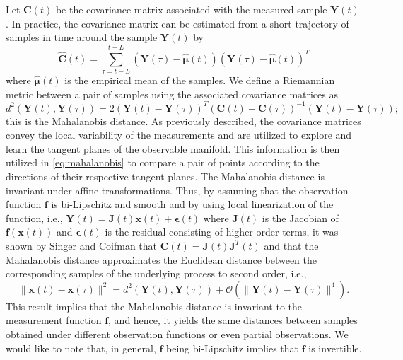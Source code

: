 \documentclass[aip,jcp,preprint]{revtex4-1}
\begin{document}
Let $\mathbf{C}(t)$ be the covariance matrix associated with the measured sample $\mathbf{Y}(t)$. In practice, the covariance matrix can be estimated from a short trajectory of samples in time around the sample $\mathbf{Y}(t)$ by
\begin{equation}
	\widehat{\mathbf{C}}(t) = \sum \limits _{\tau = t-L}^{t+L} (\mathbf{Y}(\tau) - \widehat{\boldsymbol{\mu}}(t))(\mathbf{Y}(\tau) - \widehat{\boldsymbol{\mu}}(t))^T
	\label{eq:cov}
\end{equation}
where $\widehat{\boldsymbol{\mu}}(t)$ is the empirical mean of the samples.
%
We define a Riemannian metric between a pair of samples using the associated covariance matrices as
\begin{equation}
	d^2(\mathbf{Y}(t), \mathbf{Y}(\tau)) = 2 (\mathbf{Y}(t) - \mathbf{Y}(\tau))^T(\mathbf{C}(t) + \mathbf{C}(\tau))^{-1}(\mathbf{Y}(t) - \mathbf{Y}(\tau));
	\label{eq:mahalanobis}
\end{equation}
this is the Mahalanobis distance.
%
As previously described, the covariance matrices convey the local variability of the measurements and are utilized to explore and learn the tangent planes of the observable manifold.
%
This information is then utilized in \eqref{eq:mahalanobis} to compare a pair of points according to the directions of their respective tangent planes.
%
The Mahalanobis distance is invariant under affine transformations.
%
Thus, by assuming that the observation function $\mathbf{f}$ is bi-Lipschitz and smooth and by using local linearization of the function, i.e., $\mathbf{Y}(t) = \mathbf{J}(t) \mathbf{x}(t) + \boldsymbol{\epsilon}(t)$ where $\mathbf{J}(t)$ is the Jacobian of $\mathbf{f}(\mathbf{x}(t))$ and $\boldsymbol{\epsilon}(t)$ is the residual consisting of higher-order terms, it was shown by Singer and Coifman \cite{singer2008non} that $\mathbf{C}(t) = \mathbf{J}(t)\mathbf{J}^T(t)$ and that the Mahalanobis distance approximates the Euclidean distance between the corresponding samples of the underlying process to second order, i.e.,
\begin{equation}
	\| \mathbf{x}(t) - \mathbf{x}(\tau) \|^2 = d^2(\mathbf{Y}(t), \mathbf{Y}(\tau)) + \mathcal{O}(\| \mathbf{Y}(t) - \mathbf{Y}(\tau)\|^4).
\end{equation}
%
This result implies that the Mahalanobis distance is invariant to the measurement function $\mathbf{f}$, and hence,
it yields the same distances between samples obtained under different observation functions or even partial observations.
%
We would like to note that, in general, $\mathbf{f}$ being bi-Lipschitz implies that $\mathbf{f}$ is invertible.
\end{document}
